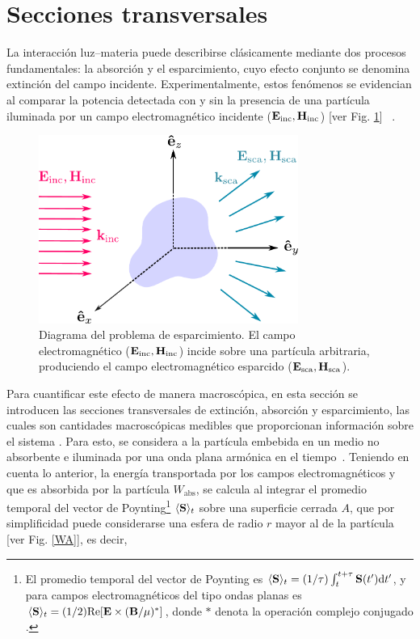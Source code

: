 

\section{Secciones transversales}
\label{section:yth}
La interacción luz–materia puede describirse clásicamente mediante dos procesos fundamentales: la absorción y el esparcimiento, cuyo efecto conjunto se denomina extinción del campo incidente. Experimentalmente, estos fenómenos se evidencian al comparar la potencia detectada con y sin la presencia de una partícula iluminada por un campo electromagnético incidente  ($\vb{E}_{\text{inc}}, \vb{H}_{\text{inc}}$) [ver Fig. \ref{scattering}] ~\cite{bohrenAbsorptionScatteringLight2008}.
%
\begin{figure}[h]
	\centering
	\includegraphics[width=8.5cm]{../../Figuras/scattering.pdf}
	\caption{Diagrama del problema de esparcimiento. El campo electromagnético ($\vb{E}_{\text{inc}}, \vb{H}_{\text{inc}}$) incide sobre una partícula arbitraria, produciendo el campo electromagnético esparcido ($\vb{E}_{\text{sca}}, \vb{H}_{\text{sca}}$).}
	\label{scattering}
\end{figure}
%
Para cuantificar este efecto de manera macroscópica, en esta sección se introducen las secciones transversales de extinción, absorción y esparcimiento, las cuales son cantidades macroscópicas medibles que proporcionan información sobre el sistema \cite{bohrenAbsorptionScatteringLight2008}. Para esto, se considera a la partícula embebida en un medio no absorbente e iluminada por una onda plana armónica en el tiempo~\cite{bohrenAbsorptionScatteringLight2008}. Teniendo en cuenta lo anterior, la energía transportada por los campos electromagnéticos y que es absorbida por la partícula $W_{\text{abs}}$, se calcula al integrar el promedio temporal del vector de Poynting\footnote{El promedio temporal del vector de Poynting es $\langle\vb{S}\rangle_t = (1/\tau)\int_t^{t+\tau}\vb{S}(t')\text{d}t'$, y para campos electromagnéticos del tipo ondas planas es $\langle\vb{S}\rangle_t = (1/2) \text{Re}[\vb{E} \times (\vb{B}/\mu)^{*}]$, donde $*$ denota la operación complejo conjugado \cite{bohrenAbsorptionScatteringLight2008}. } $\langle\vb{S}\rangle_t$  sobre una superficie cerrada $A$, que por simplificidad puede considerarse una esfera de radio $r$ mayor al de la partícula [ver Fig. \ref{WA}], es decir, 
